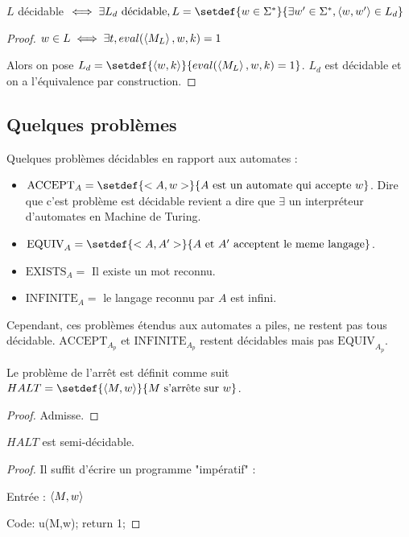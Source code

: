 \begin{prop}
	$L$ décidable $\iff \exists L_d \text{ décidable}, L = \setdef {w \in \mots} {\exists w' \in \mots, \encode{w,w'} \in L_d}$
\end{prop}


\begin{proof}
	$w \in L \iff \exists t, eval(\left\langle M_L\right\rangle, w, k) = 1$

	Alors on pose $L_d = \setdef {\encode{w, k}} {eval(\encode {M_L}, w,k) = 1}$.
	$L_d$ est décidable et on a l'équivalence par construction.
\end{proof}


\subsection{Quelques problèmes}

Quelques problèmes décidables en rapport aux automates :

\begin{itemize}
	\item $\text{ACCEPT}_A = \setdef {<A,w>} {A \text { est un automate qui accepte } w}$.
	      Dire que c'est problème est décidable revient a dire que $\exists$ un interpréteur d'automates en Machine de Turing.
	\item $\text{EQUIV}_A = \setdef {<A,A'>} {A \text { et } A' \text{ acceptent le meme langage}}$.
	\item $\text{EXISTS}_A = $ Il existe un mot reconnu.
	\item $\text{INFINITE}_A = $ le langage reconnu par $A$ est infini.
\end{itemize}

Cependant, ces problèmes étendus aux automates a piles, ne restent pas tous décidable.
$\text{ACCEPT}_{A_p}$ et $\text{INFINITE}_{A_p}$ restent décidables mais pas $\text{EQUIV}_{A_p}$.

\begin{definition}
	Le problème de l'arrêt est définit comme suit $HALT = \setdef {\encode{M,w}} {M \text{ s'arrête sur } w}$.
\end{definition}

\begin{proof}
	Admisse.
\end{proof}

\begin{prop}
	$HALT$ est semi-décidable.
\end{prop}

\begin{proof}
	Il suffit d'écrire un programme "impératif" :

	Entrée : $\left\langle M,w\right\rangle$

	Code:
	u(M,w);
	return 1;

\end{proof}

